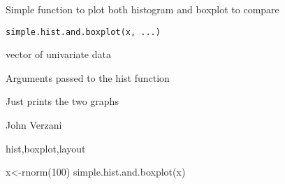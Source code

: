 \begin{Description}\relax
Simple function to plot both histogram and boxplot to compare
\end{Description}
\begin{Usage}
\begin{verbatim}
simple.hist.and.boxplot(x, ...)
\end{verbatim}
\end{Usage}
\begin{Arguments}
\begin{ldescription}
\item[\code{x}] vector of univariate data 
\item[\code{...}] Arguments passed to the hist function 
\end{ldescription}
\end{Arguments}
\begin{Value}
Just prints the two graphs
\end{Value}
\begin{Author}\relax
John Verzani
\end{Author}
\begin{SeeAlso}\relax
hist,boxplot,layout
\end{SeeAlso}
\begin{Examples}
\begin{ExampleCode}
x<-rnorm(100)
simple.hist.and.boxplot(x)
\end{ExampleCode}
\end{Examples}

